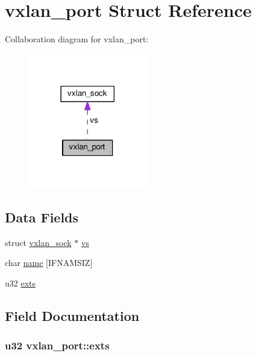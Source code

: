 \hypertarget{structvxlan__port}{}\section{vxlan\+\_\+port Struct Reference}
\label{structvxlan__port}


Collaboration diagram for vxlan\+\_\+port\+:
\nopagebreak
\begin{figure}[H]
\begin{center}
\leavevmode
\includegraphics[width=146pt]{structvxlan__port__coll__graph}
\end{center}
\end{figure}
\subsection*{Data Fields}
\begin{DoxyCompactItemize}
\item 
struct \hyperlink{structvxlan__sock}{vxlan\+\_\+sock} $\ast$ \hyperlink{structvxlan__port_a28d2b1a2a5beaaf48453d1e0628efb88}{vs}
\item 
char \hyperlink{structvxlan__port_a48b3eb83bbca17229480cf0d7a130272}{name} \mbox{[}I\+F\+N\+A\+M\+S\+I\+Z\mbox{]}
\item 
u32 \hyperlink{structvxlan__port_a4c4814fa8ff2517ef89920c98c1d66ba}{exts}
\end{DoxyCompactItemize}


\subsection{Field Documentation}
\hypertarget{structvxlan__port_a4c4814fa8ff2517ef89920c98c1d66ba}{}
\subsubsection[{exts}]{\setlength{\rightskip}{0pt plus 5cm}u32 vxlan\+\_\+port\+::exts}\label{structvxlan__port_a4c4814fa8ff2517ef89920c98c1d66ba}
\hypertarget{structvxlan__port_a48b3eb83bbca17229480cf0d7a130272}{}
